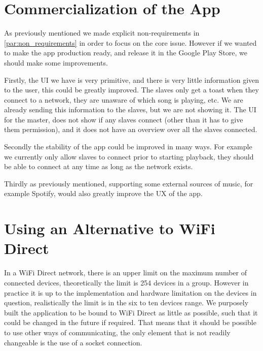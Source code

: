 \section{Commercialization of the App}
As previously mentioned we made explicit non-requirements in \cref{par:non_requirements} in order to focus on the core issue.
However if we wanted to make the app production ready, and release it in the Google Play Store, we should make some improvements.

Firstly, the UI we have is very primitive, and there is very little information given to the user, this could be greatly improved.
The slaves only get a toast when they connect to a network, they are unaware of which song is playing, etc.
We are already sending this information to the slaves, but we are not showing it.
The UI for the master, does not show if any slaves connect (other than it has to give them permission), and it does not have an overview over all the slaves connected.

Secondly the stability of the app could be improved in many ways.
For example we currently only allow slaves to connect prior to starting playback, they should be able to connect at any time as long as the network exists.

Thirdly as previously mentioned, supporting some external sources of music, for example Spotify, would also greatly improve the \ac{UX} of the app.

\section{Using an Alternative to WiFi Direct}
In a WiFi Direct network, there is an upper limit on the maximum number of connected devices, theoretically the limit is 254 devices in a group.
However in practice it is up to the implementation and hardware limitation on the devices in question, realistically the limit is in the six to ten devices range.
We purposely built the application to be bound to WiFi Direct as little as possible, such that it could be changed in the future if required.
That means that it should be possible to use other ways of communicating, the only element that is not readily changeable is the use of a socket connection.




